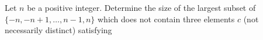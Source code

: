 Let $n$ be a positive integer.  Determine the size of the largest subset of $\{ -n, -n+1, \dots, n-1, n\}$ which does not contain three elements   $c$ (not necessarily distinct) satisfying 